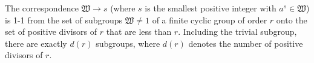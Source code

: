 The correspondence $\mathfrak{W} \to s$ (where $s$ is the smallest positive integer with $a^s \in \mathfrak{W}$) is 1-1 from the set of subgroups $\mathfrak{W} \neq 1$ of a finite cyclic group of order $r$ onto the set of positive divisors of $r$ that are less than $r$. Including the trivial subgroup, there are exactly $d(r)$ subgroups, where $d(r)$ denotes the number of positive divisors of $r$.

